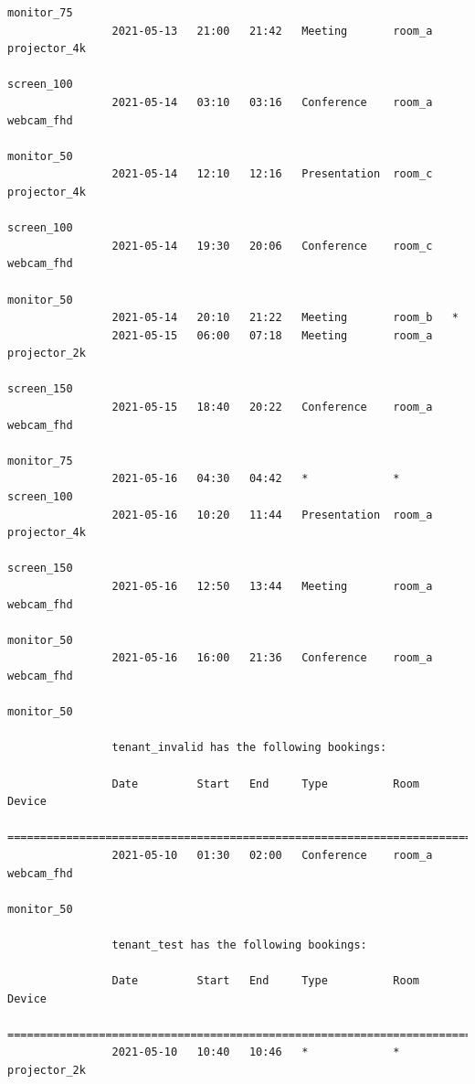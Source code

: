 \documentclass{article}
\begin{document}
\begin{Verbatim}[gobble=8]
                                                                    monitor_75
                2021-05-13   21:00   21:42   Meeting       room_a   projector_4k
                                                                    screen_100
                2021-05-14   03:10   03:16   Conference    room_a   webcam_fhd
                                                                    monitor_50
                2021-05-14   12:10   12:16   Presentation  room_c   projector_4k
                                                                    screen_100
                2021-05-14   19:30   20:06   Conference    room_c   webcam_fhd
                                                                    monitor_50
                2021-05-14   20:10   21:22   Meeting       room_b   *
                2021-05-15   06:00   07:18   Meeting       room_a   projector_2k
                                                                    screen_150
                2021-05-15   18:40   20:22   Conference    room_a   webcam_fhd
                                                                    monitor_75
                2021-05-16   04:30   04:42   *             *        screen_100
                2021-05-16   10:20   11:44   Presentation  room_a   projector_4k
                                                                    screen_150
                2021-05-16   12:50   13:44   Meeting       room_a   webcam_fhd
                                                                    monitor_50
                2021-05-16   16:00   21:36   Conference    room_a   webcam_fhd
                                                                    monitor_50
                
                tenant_invalid has the following bookings:
                
                Date         Start   End     Type          Room     Device
                ===========================================================================
                2021-05-10   01:30   02:00   Conference    room_a   webcam_fhd
                                                                    monitor_50
                
                tenant_test has the following bookings:
                
                Date         Start   End     Type          Room     Device
                ===========================================================================
                2021-05-10   10:40   10:46   *             *        projector_2k
                

\end{Verbatim}
\end{document}
